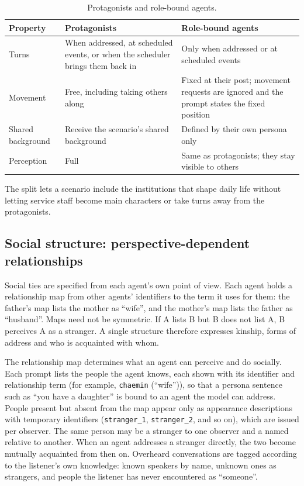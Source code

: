 \begin{table}[htbp]
  \centering
  \caption{Protagonists and role-bound agents.}
  \label{tab:methods:roles}
  \small
  \begin{tabularx}{\linewidth}{@{}l >{\raggedright\arraybackslash}X >{\raggedright\arraybackslash}X@{}}
    \toprule
    Property & Protagonists & Role-bound agents \\
    \midrule
    Turns & When addressed, at scheduled events, or when the scheduler brings them back in & Only when addressed or at scheduled events \\
    Movement & Free, including taking others along & Fixed at their post; movement requests are ignored and the prompt states the fixed position \\
    Shared background & Receive the scenario's shared background & Defined by their own persona only \\
    Perception & Full & Same as protagonists; they stay visible to others \\
    \bottomrule
  \end{tabularx}
\end{table}

The split lets a scenario include the institutions that shape daily life without letting service staff become main characters or take turns away from the protagonists.

\subsection{Social structure: perspective-dependent relationships}
\label{sec:methods:social}

Social ties are specified from each agent's own point of view. Each agent holds a relationship map from other agents' identifiers to the term it uses for them: the father's map lists the mother as ``wife'', and the mother's map lists the father as ``husband''. Maps need not be symmetric. If A lists B but B does not list A, B perceives A as a stranger. A single structure therefore expresses kinship, forms of address and who is acquainted with whom.

The relationship map determines what an agent can perceive and do socially. Each prompt lists the people the agent knows, each shown with its identifier and relationship term (for example, \texttt{chaemin} (``wife'')), so that a persona sentence such as ``you have a daughter'' is bound to an agent the model can address. People present but absent from the map appear only as appearance descriptions with temporary identifiers (\texttt{stranger\_1}, \texttt{stranger\_2}, and so on), which are issued per observer. The same person may be a stranger to one observer and a named relative to another. When an agent addresses a stranger directly, the two become mutually acquainted from then on. Overheard conversations are tagged according to the listener's own knowledge: known speakers by name, unknown ones as strangers, and people the listener has never encountered as ``someone''.

